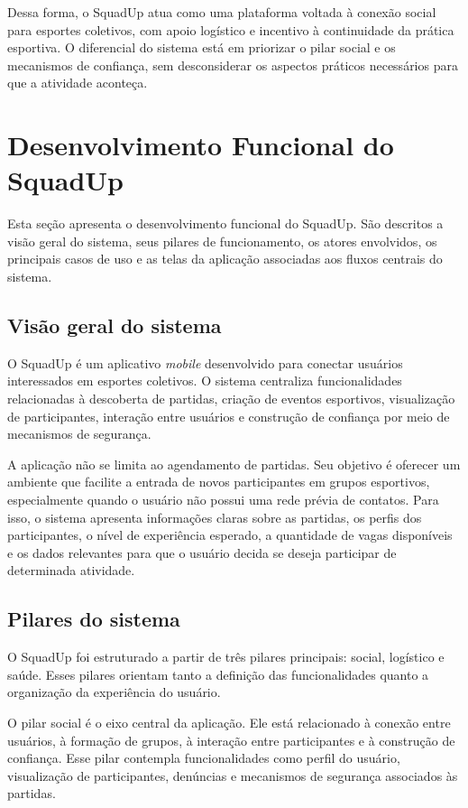 \documentclass[a4paper, 12pt]{article}
\begin{document}
\begin{justify}
Dessa forma, o SquadUp atua como uma plataforma voltada à conexão social para esportes coletivos, com apoio logístico e incentivo à continuidade da prática esportiva. O diferencial do sistema está em priorizar o pilar social e os mecanismos de confiança, sem desconsiderar os aspectos práticos necessários para que a atividade aconteça.

\clearpage

\section{Desenvolvimento Funcional do SquadUp}

Esta seção apresenta o desenvolvimento funcional do SquadUp. São descritos a visão geral do sistema, seus pilares de funcionamento, os atores envolvidos, os principais casos de uso e as telas da aplicação associadas aos fluxos centrais do sistema.

\subsection{Visão geral do sistema}

O SquadUp é um aplicativo \textit{mobile} desenvolvido para conectar usuários interessados em esportes coletivos. O sistema centraliza funcionalidades relacionadas à descoberta de partidas, criação de eventos esportivos, visualização de participantes, interação entre usuários e construção de confiança por meio de mecanismos de segurança.

A aplicação não se limita ao agendamento de partidas. Seu objetivo é oferecer um ambiente que facilite a entrada de novos participantes em grupos esportivos, especialmente quando o usuário não possui uma rede prévia de contatos. Para isso, o sistema apresenta informações claras sobre as partidas, os perfis dos participantes, o nível de experiência esperado, a quantidade de vagas disponíveis e os dados relevantes para que o usuário decida se deseja participar de determinada atividade.

\subsection{Pilares do sistema}

O SquadUp foi estruturado a partir de três pilares principais: social, logístico e saúde. Esses pilares orientam tanto a definição das funcionalidades quanto a organização da experiência do usuário.

O pilar social é o eixo central da aplicação. Ele está relacionado à conexão entre usuários, à formação de grupos, à interação entre participantes e à construção de confiança. Esse pilar contempla funcionalidades como perfil do usuário, visualização de participantes, denúncias e mecanismos de segurança associados às partidas.


\end{justify}
\end{document}
